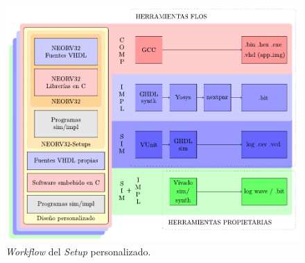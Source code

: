 \begin{figure}[H]
    \centering
    \includegraphics[width=14cm]{Figuras/workflow.pdf}
    \caption{\textit{Workflow} del \textit{Setup} personalizado.}
    \label{fig:workf}
\end{figure}

